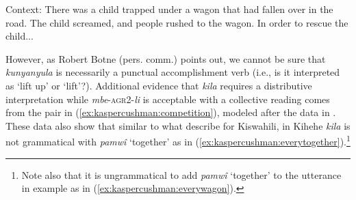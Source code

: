 \documentclass[output=paper,modfonts,nonflat]{langsci/langscibook}
\begin{document}
\begin{exe}

 \ex Context: There was a child trapped under a wagon that had fallen over in the road. The child screamed, and people rushed to the wagon. In order to rescue the child... \label{ex:kaspercushman:wagon}

\begin{xlist}
\end{xlist}
\end{exe}


However, as Robert Botne (pers. comm.) points out, we cannot be sure that \textit{kunyanyula} is necessarily a punctual accomplishment verb (i.e., is it interpreted as `lift up' or `lift'?). Additional evidence that \textit{kila} requires a distributive interpretation while \textit{mbe}-\textsc{agr2}-\textit{li} is acceptable with a collective reading comes from the pair in (\ref{ex:kaspercushman:competition}), modeled after the data in \cite[396--397]{zerbian08}. These data also show that similar to what \cite[397]{zerbian08} describe for Kiswahili, in Kihehe \textit{kila} is not grammatical with \textit{pamw\^i} `together' as in  (\ref{ex:kaspercushman:everytogether}).\footnote{Note also that it is ungrammatical to add \textit{pamw\^i} `together' to the utterance in example as in  (\ref{ex:kaspercushman:everywagon}).\label{foot:kaspercushman:competition}}


\begin{exe}
\ex  \label{ex:kaspercushman:competition} \begin{xlist}

\end{xlist}
\end{exe}
\end{document}
